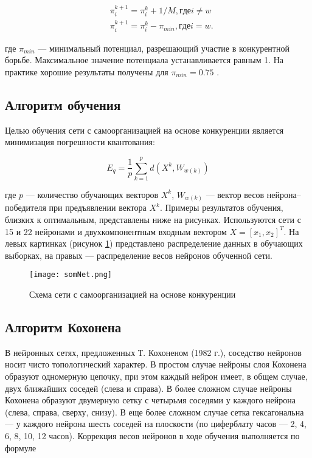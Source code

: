 \begin{equation}\label{eq:system}
		\begin{aligned}
		&	\pi _ { i } ^ { k + 1 } = \pi _ { i } ^ { k } + 1 / M, где i \neq w\\
		&   \pi _ { i } ^ { k + 1 } = \pi _ { i } ^ { k } - \pi _ { min }, где i = w.
		\end{aligned}  		
\end{equation}

где $\pi_{min}$ — минимальный потенциал, разрешающий участие в конкурентной борьбе. Максимальное значение потенциала устанавливается равным 1. На практике хорошие результаты получены для $\pi_{min} = 0.75$ .

\subsection{Алгоритм обучения}

Целью обучения сети с самоорганизацией на основе конкуренции является минимизация погрешности квантования:

\begin{equation}
 E _ { q } = \frac { 1 } { p } \sum _ { k = 1 } ^ { p } d \left( X ^ { k } , W _ { w ( k ) } \right)
\end{equation}

где $p$ — количество обучающих векторов $X^k$, $W_{w(k)}$ — вектор весов нейрона–победителя при предъявлении вектора $X^k$.
Примеры результатов обучения, близких к оптимальным, представлены
ниже на рисунках. Используются сети с 15 и 22 нейронами и двухкомпонентным входным вектором $X = \left[ x _ { 1 } , x _ { 2 } \right] ^ { T }$. На левых картинках (рисунок \ref{img:somNetr}) представлено распределение данных в обучающих выборках, на правых --- распределение весов нейронов обученной сети.

\begin{figure}[H]
\centering
\texttt{[image: somNet.png]}
\caption{Схема сети с самоорганизацией на основе конкуренции}
\label{img:somNetr}
\end{figure}



\subsection{Алгоритм Кохонена}

В нейронных сетях, предложенных Т. Кохоненом (1982 г.), соседство нейронов
носит чисто топологический характер. В простом случае нейроны
слоя Кохонена образуют одномерную цепочку, при этом каждый нейрон
имеет, в общем случае, двух ближайших соседей (слева и справа).
В более сложном случае нейроны Кохонена образуют двумерную сетку
с четырьмя соседями у каждого нейрона (слева, справа, сверху, снизу).
В еще более сложном случае сетка гексагональна — у каждого нейрона
шесть соседей на плоскости (по циферблату часов — 2, 4, 6, 8, 10, 12
часов).
Коррекция весов нейронов в ходе обучения выполняется по формуле

